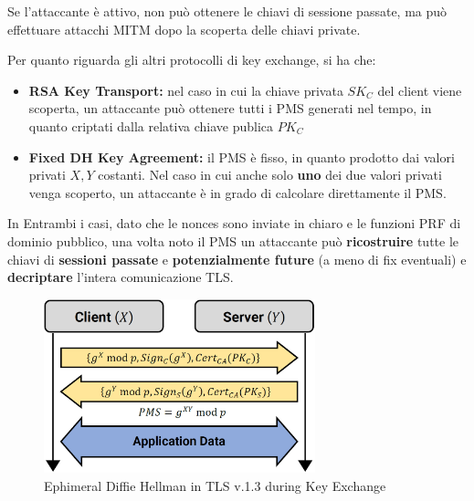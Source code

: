 \begin{remark}
Se l'attaccante è attivo, non può ottenere le chiavi di sessione passate, ma può effettuare attacchi MITM dopo la scoperta delle chiavi private.
\end{remark}
Per quanto riguarda gli altri protocolli di key exchange, si ha che:
\begin{itemize}
    \item \textbf{RSA Key Transport:} nel caso in cui la chiave privata $SK_C$ del client viene scoperta, un attaccante può ottenere tutti i PMS generati nel tempo, in quanto criptati dalla relativa chiave publica $PK_C$
    \item \textbf{Fixed DH Key Agreement:} il PMS è fisso, in quanto prodotto dai valori privati $X,Y$ costanti. Nel caso in cui anche solo \textbf{uno} dei due valori privati venga scoperto, un attaccante è in grado di calcolare direttamente il PMS.
\end{itemize}
In Entrambi i casi, dato che le nonces sono inviate in chiaro e le funzioni PRF di dominio pubblico, una volta noto il PMS un attaccante può \textbf{ricostruire} tutte le chiavi di \textbf{sessioni passate} e \textbf{potenzialmente future} (a meno di fix eventuali) e \textbf{decriptare} l'intera comunicazione TLS.
\begin{figure}[h]
    \centering
    \includegraphics[width=0.7\textwidth]{image/ephdh.png}
    \caption{Ephimeral Diffie Hellman in TLS v.1.3 during Key Exchange}
    \label{fig:ephdh}
\end{figure}
